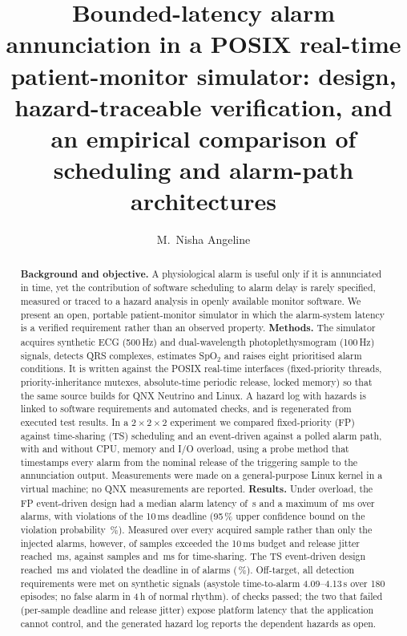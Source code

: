 \documentclass[preprint,3p,10pt]{elsarticle}
\begin{document}
\begin{frontmatter}
\title{Bounded-latency alarm annunciation in a POSIX real-time patient-monitor simulator: design, hazard-traceable verification, and an empirical comparison of scheduling and alarm-path architectures}

\author[vcet]{M.~Nisha Angeline}
\address[vcet]{Department of Electronics and Communication Engineering, Velalar College of Engineering and Technology, Thindal, Erode, Tamil Nadu, India}

\begin{abstract}
\textbf{Background and objective.} A physiological alarm is useful only if it is annunciated in time, yet the contribution of software scheduling to alarm delay is rarely specified, measured or traced to a hazard analysis in openly available monitor software. We present an open, portable patient-monitor simulator in which the alarm-system latency is a verified requirement rather than an observed property.
\textbf{Methods.} The simulator acquires synthetic ECG (500\,Hz) and dual-wavelength photoplethysmogram (100\,Hz) signals, detects QRS complexes, estimates SpO$_2$ and raises eight prioritised alarm conditions. It is written against the POSIX real-time interfaces (fixed-priority threads, priority-inheritance mutexes, absolute-time periodic release, locked memory) so that the same source builds for QNX Neutrino and Linux. A hazard log with \NHaz{} hazards is linked to \NReq{} software requirements and \NVerTotal{} automated checks, and is regenerated from executed test results. In a $2\times2\times2$ experiment we compared fixed-priority (FP) against time-sharing (TS) scheduling and an event-driven against a polled alarm path, with and without CPU, memory and I/O overload, using a probe method that timestamps every alarm from the nominal release of the triggering sample to the annunciation output. Measurements were made on a general-purpose Linux kernel in a virtual machine; no QNX measurements are reported.
\textbf{Results.} Under overload, the FP event-driven design had a median alarm latency of \NFpEvStrMed\,\textmu s and a maximum of \NFpEvStrMaxMs\,ms over \NFpEvStrN{} alarms, with \NFpEvStrMiss{} violations of the 10\,ms deadline (95\,\% upper confidence bound on the violation probability \NFpEvStrUB\,\%). Measured over every acquired sample rather than only the injected alarms, however, \NFpEvStrPipeMiss{} of \NFpEvStrNSamp{} samples exceeded the 10\,ms budget and release jitter reached \NFpEvStrJitMaxMs\,ms, against \NTsEvStrPipeMiss{} samples and \NTsEvStrJitMaxMs\,ms for time-sharing. The TS event-driven design reached \NTsEvStrMaxMs\,ms and violated the deadline in \NTsEvStrMiss{} of \NTsEvStrN{} alarms (\NTsEvStrMissPct\,\%). Off-target, all detection requirements were met on synthetic signals (asystole time-to-alarm 4.09--4.13\,s over 180 episodes; no false alarm in 4\,h of normal rhythm). \NVerPass{} of \NVerTotal{} checks passed; the two that failed (per-sample deadline and release jitter) expose platform latency that the application cannot control, and the generated hazard log reports the \NHazOpen{} dependent hazards as open.

\end{abstract}
\end{frontmatter}
\end{document}
